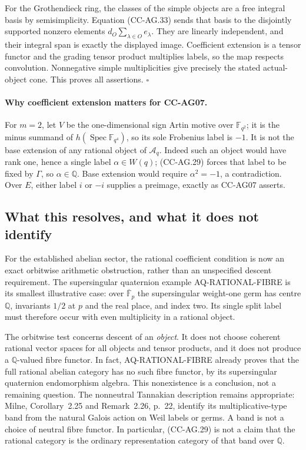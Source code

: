 \documentclass[11pt,a4paper]{article}
\theoremstyle{definition}\newtheorem{definition}[theorem]{Definition}
\theoremstyle{remark}\newtheorem{remark}[theorem]{Remark}
\begin{document}
For the Grothendieck ring, the classes of the simple
objects are a free integral basis by semisimplicity.
Equation (CC-AG.33) sends that basis to the disjointly
supported nonzero elements
\(d_O\sum_{\lambda\in O}e_\lambda\).  They are linearly
independent, and their integral span is exactly the
displayed image.  Coefficient extension is a tensor
functor and the grading tensor product multiplies labels,
so the map respects convolution.  Nonnegative simple
multiplicities give precisely the stated actual-object
cone.  This proves all assertions. \(\square\)

\paragraph{Why coefficient extension matters for CC-AG07.}
For \(m=2\), let \(V\) be the one-dimensional sign Artin
motive over \(\mathbb F_{q^2}\); it is the minus summand of
\(h(\operatorname{Spec}\mathbb F_{q^4})\), so its sole
Frobenius label is \(-1\).  It is not the base extension of
any rational object of \(\mathcal A_q\).  Indeed such an
object would have rank one, hence a single label
\(\alpha\in W(q)\); (CC-AG.29) forces that label to be
fixed by \(\Gamma\), so \(\alpha\in\mathbb Q\).
Base extension would require \(\alpha^2=-1\), a
contradiction.  Over \(E\), either label \(i\) or \(-i\)
supplies a preimage, exactly as CC-AG07 asserts.

\subsection{What this resolves, and what it does not identify}

For the established abelian sector, the rational coefficient
condition is now an exact orbitwise arithmetic obstruction,
rather than an unspecified descent requirement.  The
supersingular quaternion example AQ-RATIONAL-FIBRE is its
smallest illustrative case: over \(\overline{\mathbb F}_p\)
the supersingular weight-one germ has centre \(\mathbb Q\),
invariants \(1/2\) at \(p\) and the real place, and index
two.  Its single split label must therefore occur with
even multiplicity in a rational object.

The orbitwise test concerns descent of an \emph{object}.
It does not choose coherent rational vector spaces for all
objects and tensor products, and it does not produce a
\(\mathbb Q\)-valued fibre functor.  In fact,
AQ-RATIONAL-FIBRE already proves that the full rational
abelian category has no such fibre functor, by its
supersingular quaternion endomorphism algebra.  This
nonexistence is a conclusion, not a remaining question.
The nonneutral Tannakian description remains appropriate: Milne,
Corollary~2.25 and Remark~2.26, p.~22, identify its
multiplicative-type band from the natural Galois action on
Weil labels or germs.  A band is not a choice of neutral
fibre functor.  In particular, (CC-AG.29) is not a claim
that the rational category is the ordinary representation
category of that band over \(\mathbb Q\).
\end{document}
